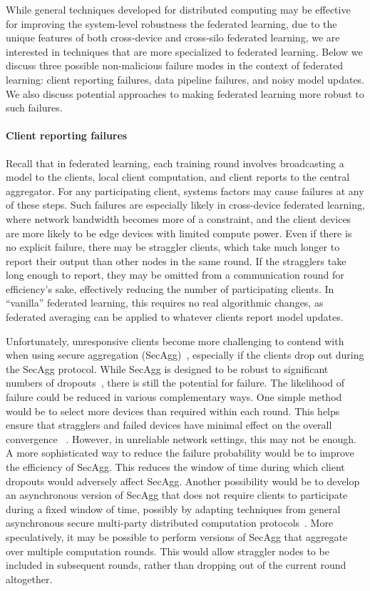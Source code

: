 \documentclass[11pt]{article}
\begin{document}
While general techniques developed for distributed computing may be effective for improving the system-level robustness the federated learning, due to the unique features of both cross-device and cross-silo federated learning, we are interested in techniques that are more specialized to federated learning. Below we discuss three possible non-malicious failure modes in the context of federated learning: client reporting failures, data pipeline failures, and noisy model updates. We also discuss potential approaches to making federated learning more robust to such failures.

\paragraph{Client reporting failures}
Recall that in federated learning, each training round involves broadcasting a model to the clients, local client computation, and client reports to the central aggregator. For any participating client, systems factors may cause failures at any of these steps. Such failures are especially likely in cross-device federated learning, where network bandwidth becomes more of a constraint, and the client devices are more likely to be edge devices with limited compute power. Even if there is no explicit failure, there may be straggler clients, which take much longer to report their output than other nodes in the same round. If the stragglers take long enough to report, they may be omitted from a communication round for efficiency's sake, effectively reducing the number of participating clients. In “vanilla” federated learning, this requires no real algorithmic changes, as federated averaging can be applied to whatever clients report model updates.

Unfortunately, unresponsive clients become more challenging to contend with when using secure aggregation (SecAgg)~\citep{bonawitz17secagg, bell20secagg}, especially if the clients drop out during the SecAgg protocol. While SecAgg is designed to be robust to significant numbers of dropouts~\citep{bonawitz19sysml}, there is still the potential for failure. The likelihood of failure could be reduced in various complementary ways. One simple method would be to select more devices than required within each round. This helps ensure that stragglers and failed devices have minimal effect on the overall convergence ~\citep{bonawitz19sysml}. However, in unreliable network settings, this may not be enough. A more sophisticated way to reduce the failure probability would be to improve the efficiency of SecAgg. This reduces the window of time during which client dropouts would adversely affect SecAgg. Another possibility would be to develop an asynchronous version of SecAgg that does not require clients to participate during a fixed window of time, possibly by adapting techniques from general asynchronous secure multi-party distributed computation protocols~\citep{srinathan2000efficient}. More speculatively, it may be possible to perform versions of SecAgg that aggregate over multiple computation rounds. This would allow straggler nodes to be included in subsequent rounds, rather than dropping out of the current round altogether.
\end{document}
